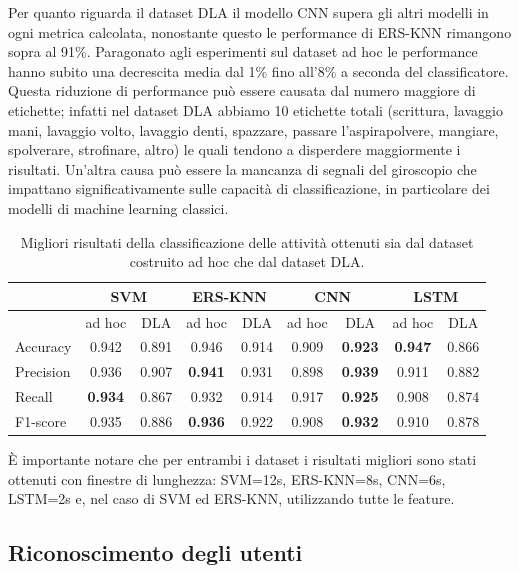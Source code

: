 Per quanto riguarda il dataset DLA il modello CNN supera gli altri modelli in ogni metrica calcolata, nonostante questo le performance di ERS-KNN rimangono sopra al 91\%. Paragonato agli esperimenti sul dataset ad hoc le performance hanno subito una decrescita media dal 1\% fino all'8\% a seconda del classificatore. Questa riduzione di performance può essere causata dal numero maggiore di etichette; infatti nel dataset DLA abbiamo 10 etichette totali (scrittura, lavaggio mani, lavaggio volto, lavaggio denti, spazzare, passare l'aspirapolvere, mangiare, spolverare, strofinare, altro) le quali tendono a disperdere maggiormente i risultati. Un'altra causa può essere la mancanza di segnali del giroscopio che impattano significativamente sulle capacità di classificazione, in particolare dei modelli di machine learning classici.

\begin{table}
    \centering
    \begin{tabular}{l | c c | c c | c c | c c }
        \hline
        & \multicolumn{2}{c}{SVM} & \multicolumn{2}{c}{ERS-KNN} & \multicolumn{2}{c}{CNN} & \multicolumn{2}{c}{LSTM} \\
        \hline 
        & ad hoc & DLA & ad hoc & DLA & ad hoc & DLA & ad hoc & DLA \\
        Accuracy & 0.942 & 0.891 & 0.946 & 0.914 & 0.909 & \textbf{0.923} & \textbf{0.947} & 0.866 \\
        Precision & 0.936 & 0.907 & \textbf{0.941} & 0.931 & 0.898 & \textbf{0.939} & 0.911 & 0.882 \\
        Recall & \textbf{0.934} & 0.867 & 0.932 & 0.914 & 0.917 & \textbf{0.925} & 0.908 & 0.874 \\
        F1-score& 0.935 & 0.886 & \textbf{0.936} & 0.922 & 0.908 & \textbf{0.932} & 0.910 & 0.878\\
        \hline
    \end{tabular}
    \caption{Migliori risultati della classificazione delle attività ottenuti sia dal dataset costruito ad hoc che dal dataset DLA.}
    \label{tab:activity-classification}
\end{table}

\`E importante notare che per entrambi i dataset i risultati migliori sono stati ottenuti con finestre di lunghezza: SVM=12s, ERS-KNN=8s, CNN=6s, LSTM=2s e, nel caso di SVM ed ERS-KNN, utilizzando tutte le feature.

\subsection{Riconoscimento degli utenti}
\label{ssec:riconoscimento-degli-utenti}


